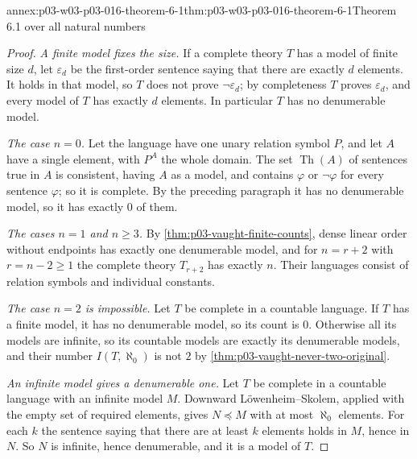 \begin{annexitem}{annex:p03-w03-p03-016-theorem-6-1}{thm:p03-w03-p03-016-theorem-6-1}{Theorem 6.1 over all natural numbers}
\begin{proof}
\emph{A finite model fixes the size.} If a complete theory \(T\) has a
model of finite size \(d\), let \(\varepsilon_d\) be the first-order sentence
saying that there are exactly \(d\) elements. It holds in that model, so
\(T\) does not prove \(\neg\varepsilon_d\); by completeness \(T\) proves
\(\varepsilon_d\), and every model of \(T\) has exactly \(d\) elements.
In particular \(T\) has no denumerable model.

\emph{The case \(n=0\).} Let the language have one unary relation symbol
\(P\), and let \(A\) have a single element, with \(P^A\) the whole domain.
The set \(\operatorname{Th}(A)\) of sentences true in \(A\) is consistent,
having \(A\) as a model, and contains \(\varphi\) or \(\neg\varphi\) for
every sentence \(\varphi\); so it is complete. By the preceding paragraph
it has no denumerable model, so it has exactly \(0\) of them.

\emph{The cases \(n=1\) and \(n\ge3\).} By
\cref{thm:p03-vaught-finite-counts}, dense linear order without endpoints
has exactly one denumerable model, and for \(n=r+2\) with \(r=n-2\ge1\)
the complete theory \(T_{r+2}\) has exactly \(n\). Their languages consist
of relation symbols and individual constants.

\emph{The case \(n=2\) is impossible.} Let \(T\) be complete in a countable
language. If \(T\) has a finite model, it has no denumerable model, so its
count is \(0\). Otherwise all its models are infinite, so its countable
models are exactly its denumerable models, and their number
\(I(T,\aleph_0)\) is not \(2\) by
\cref{thm:p03-vaught-never-two-original}.

\emph{An infinite model gives a denumerable one.} Let \(T\) be complete in
a countable language with an infinite model \(M\). Downward
L\"owenheim--Skolem, applied with the empty set of required elements, gives
\(N\preccurlyeq M\) with at most \(\aleph_0\) elements. For each \(k\) the
sentence saying that there are at least \(k\) elements holds in \(M\), hence
in \(N\). So \(N\) is infinite, hence denumerable, and it is a model of
\(T\).
\end{proof}
\end{annexitem}

